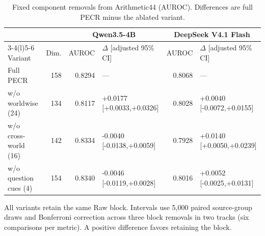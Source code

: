 \begin{table}[t]
\centering\small
\caption{Fixed component removals from Arithmetic44 (AUROC). Differences are full PECR minus the ablated variant.}
\label{tab:ablation}
\setlength{\tabcolsep}{4pt}
\begin{tabular}{@{}lrrlrl@{}}
\toprule
& & \multicolumn{2}{c}{Qwen3.5-4B} & \multicolumn{2}{c}{DeepSeek V4.1 Flash}\\\cmidrule(lr){3-4}\cmidrule(l){5-6} Variant & Dim. & AUROC & $\Delta$ [adjusted 95\% CI] & AUROC & $\Delta$ [adjusted 95\% CI]\\
\midrule
Full PECR & 158 & 0.8294 & --- & 0.8068 & ---\\
w/o worldwise (24) & 134 & 0.8117 & +0.0177 [+0.0033,+0.0326] & 0.8028 & +0.0040 [-0.0072,+0.0155]\\
w/o cross-world (16) & 142 & 0.8334 & -0.0040 [-0.0138,+0.0059] & 0.7928 & +0.0140 [+0.0050,+0.0239]\\
w/o question cues (4) & 154 & 0.8340 & -0.0046 [-0.0119,+0.0028] & 0.8016 & +0.0052 [-0.0025,+0.0131]\\
\bottomrule
\end{tabular}
\par\vspace{3pt}\begin{minipage}{\textwidth}\footnotesize All variants retain the same Raw block. Intervals use 5,000 paired source-group draws and Bonferroni correction across three block removals in two tracks (six comparisons per metric). A positive difference favors retaining the block.\end{minipage}
\end{table}
